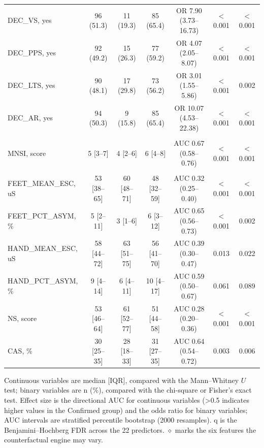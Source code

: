 \documentclass[pdflatex,sn-mathphys-num]{sn-jnl}%
\theoremstyle{thmstyleone}%
\theoremstyle{thmstyletwo}%
\theoremstyle{thmstylethree}%
\begin{document}
\begin{table}[!tbp]
\begin{tabular}{lcccccc}
        DEC\_VS, yes  & 96 (51.3) & 11 (19.3) & 85 (65.4) & OR 7.90 (3.73--16.73) & $<$0.001 & $<$0.001 \\
        DEC\_PPS, yes  & 92 (49.2) & 15 (26.3) & 77 (59.2) & OR 4.07 (2.05--8.07) & $<$0.001 & $<$0.001 \\
        DEC\_LTS, yes  & 90 (48.1) & 17 (29.8) & 73 (56.2) & OR 3.01 (1.55--5.86) & $<$0.001 & 0.002 \\
        DEC\_AR, yes  & 94 (50.3) & 9 (15.8) & 85 (65.4) & OR 10.07 (4.53--22.38) & $<$0.001 & $<$0.001 \\
        \addlinespace
        \multicolumn{7}{l}{\textit{MNSI}} \\
        MNSI, score  & 5 [3--7] & 4 [2--6] & 6 [4--8] & AUC 0.67 (0.58--0.76) & $<$0.001 & $<$0.001 \\
        \addlinespace
        \multicolumn{7}{l}{\textit{Sudoscan}} \\
        FEET\_MEAN\_ESC, uS  & 53 [38--65] & 60 [48--71] & 48 [32--59] & AUC 0.32 (0.25--0.40) & $<$0.001 & $<$0.001 \\
        FEET\_PCT\_ASYM, \%  & 5 [2--11] & 3 [1--6] & 6 [3--12] & AUC 0.65 (0.56--0.73) & $<$0.001 & 0.002 \\
        HAND\_MEAN\_ESC, uS  & 58 [44--72] & 63 [51--75] & 56 [41--70] & AUC 0.39 (0.30--0.47) & 0.013 & 0.022 \\
        HAND\_PCT\_ASYM, \%  & 9 [4--14] & 6 [4--11] & 10 [4--17] & AUC 0.59 (0.50--0.67) & 0.061 & 0.089 \\
        NS, score  & 53 [46--64] & 61 [52--77] & 51 [44--58] & AUC 0.28 (0.20--0.36) & $<$0.001 & $<$0.001 \\
        CAS, \%  & 30 [25--35] & 28 [18--33] & 31 [27--35] & AUC 0.64 (0.54--0.72) & 0.003 & 0.006 \\
        \bottomrule
    \end{tabular}
    \begin{flushleft}\footnotesize Continuous variables are median [IQR], compared with the
    Mann--Whitney $U$ test; binary variables are n (\%), compared with the chi-square or Fisher's
    exact test. Effect size is the directional AUC for continuous variables (>0.5 indicates higher
    values in the Confirmed group) and the odds ratio for binary variables; AUC intervals are
    stratified percentile bootstrap (2000 resamples). q is the Benjamini--Hochberg FDR across the
    22 predictors. $\diamond$ marks the six features the counterfactual engine may vary.\end{flushleft}
\end{table}
\end{document}
